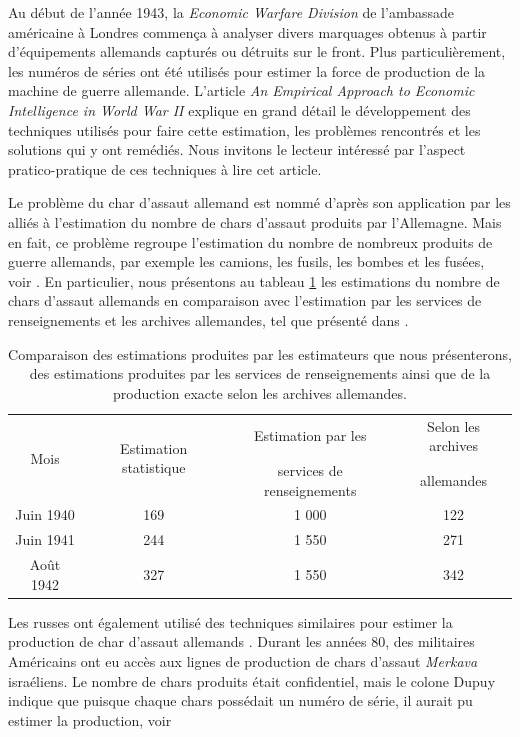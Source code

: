 \documentclass[10pt]{article}
\begin{document}
Au début de l'année 1943, la \emph{Economic Warfare Division} de
l'ambassade américaine à Londres commença à analyser divers marquages
obtenus à partir d'équipements allemands capturés ou détruits sur le
front. Plus particulièrement, les numéros de séries ont été utilisés
pour estimer la force de production de la machine de guerre allemande.
L'article \emph{An Empirical Approach to Economic Intelligence in World
War II} \cite{Ruggles1947} explique en grand détail le développement des
techniques utilisés pour faire cette estimation, les problèmes
rencontrés et les solutions qui y ont remédiés. Nous invitons le lecteur
intéressé par l'aspect pratico-pratique de ces techniques à lire cet
article.

Le problème du char d'assaut allemand est nommé d'après son application
par les alliés à l'estimation du nombre de chars d'assaut produits par
l'Allemagne. Mais en fait, ce problème regroupe l'estimation du nombre
de nombreux produits de guerre allemands, par exemple les camions, les
fusils, les bombes et les fusées, voir \cite{Ruggles1947}. En
particulier, nous présentons au tableau \ref{tab:estimation_ruggles} les
estimations du nombre de chars d'assaut allemands en comparaison avec
l'estimation par les services de renseignements et les archives
allemandes, tel que présenté dans \cite{Ruggles1947}.

\begin{table}[ht]
\begin{center}
\begin{tabular}{cccc}
\multirow{2}{*}{Mois} & \multirow{2}{*}{Estimation statistique} & Estimation par les & Selon les archives \\
& & services de renseignements &  allemandes \\
\hline
\hline
Juin 1940 & 169 & 1 000 & 122 \\
Juin 1941 & 244 & 1 550 & 271 \\
Août 1942 & 327 & 1 550 & 342 \\
\hline
\end{tabular}
\end{center}
\caption{\label{tab:estimation_ruggles} {Comparaison des estimations produites par les estimateurs que nous présenterons, des estimations produites par les services de renseignements ainsi que de la production exacte selon les archives allemandes.} }
\end{table}

Les russes ont également utilisé des techniques similaires pour estimer
la production de char d'assaut allemands \cite{Volz2008}. Durant les
années 80, des militaires Américains ont eu accès aux lignes de
production de chars d'assaut \emph{Merkava} israéliens. Le nombre de
chars produits était confidentiel, mais le colone Dupuy indique que
puisque chaque chars possédait un numéro de série, il aurait pu estimer
la production, voir \cite{Johnson}
\end{document}
